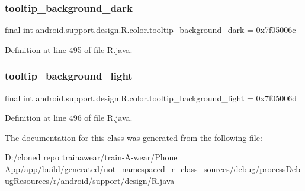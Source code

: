 \subsubsection{\texorpdfstring{tooltip\_background\_dark}{tooltip\_background\_dark}}
{\footnotesize\ttfamily final int android.\+support.\+design.\+R.\+color.\+tooltip\+\_\+background\+\_\+dark = 0x7f05006c\hspace{0.3cm}{\ttfamily [static]}}



Definition at line 495 of file R.\+java.

\mbox{\label{classandroid_1_1support_1_1design_1_1_r_1_1color_a0e4046f4766953991a1ac2f63727d588}} 
\subsubsection{\texorpdfstring{tooltip\_background\_light}{tooltip\_background\_light}}
{\footnotesize\ttfamily final int android.\+support.\+design.\+R.\+color.\+tooltip\+\_\+background\+\_\+light = 0x7f05006d\hspace{0.3cm}{\ttfamily [static]}}



Definition at line 496 of file R.\+java.



The documentation for this class was generated from the following file\+:\begin{DoxyCompactItemize}
\item 
D\+:/cloned repo trainawear/train-\/\+A-\/wear/\+Phone App/app/build/generated/not\+\_\+namespaced\+\_\+r\+\_\+class\+\_\+sources/debug/process\+Debug\+Resources/r/android/support/design/\mbox{\hyperlink{process_debug_resources_2r_2android_2support_2design_2_r_8java}{R.\+java}}\end{DoxyCompactItemize}
